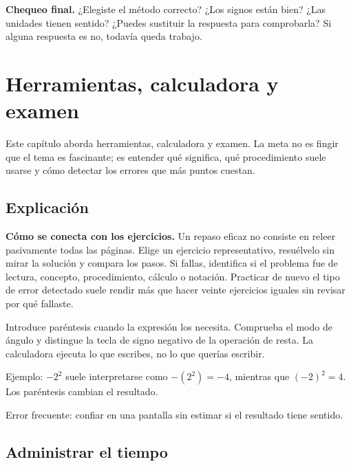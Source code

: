 \documentclass[10pt,oneside,openany]{book}
\begin{document}
\begin{idea}\textbf{Chequeo final.} ¿Elegiste el método correcto? ¿Los signos están bien? ¿Las unidades tienen sentido? ¿Puedes sustituir la respuesta para comprobarla? Si alguna respuesta es no, todavía queda trabajo.\end{idea}



\chapter{Herramientas, calculadora y examen}

\begin{idea}
Este capítulo aborda herramientas, calculadora y examen. La meta no es fingir que el tema es fascinante; es entender qué significa, qué procedimiento suele usarse y cómo detectar los errores que más puntos cuestan.
\end{idea}

\section{Explicación}

\textbf{Cómo se conecta con los ejercicios.} Un repaso eficaz no consiste en releer pasivamente todas las páginas. Elige un ejercicio representativo, resuélvelo sin mirar la solución y compara los pasos. Si fallas, identifica si el problema fue de lectura, concepto, procedimiento, cálculo o notación. Practicar de nuevo el tipo de error detectado suele rendir más que hacer veinte ejercicios iguales sin revisar por qué fallaste.

Introduce paréntesis cuando la expresión los necesita. Comprueba el modo de ángulo y distingue la tecla de signo negativo de la operación de resta. La calculadora ejecuta lo que escribes, no lo que querías escribir.



\begin{ejemplo}
Ejemplo: $-2^2$ suele interpretarse como $-(2^2)=-4$, mientras que $(-2)^2=4$. Los paréntesis cambian el resultado.
\end{ejemplo}

\begin{ojo}
Error frecuente: confiar en una pantalla sin estimar si el resultado tiene sentido.
\end{ojo}



\section{Administrar el tiempo}
\end{document}

